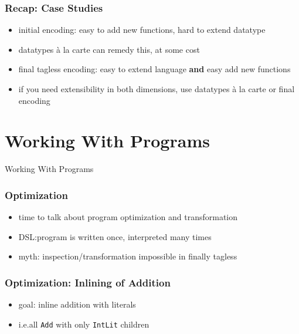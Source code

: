 \documentclass[aspectratio=169, hyperref={colorlinks, linkcolor=beamer@centricgreen}, urlcolor=links]{beamer}
\begin{document}
\begin{frame}
  \frametitle{Recap: Case Studies}
  \begin{itemize}
  \item initial encoding: easy to add new functions, hard to extend datatype
  \item datatypes \`{a} la carte can remedy this, at some cost
  \item final tagless encoding: easy to extend language \textbf{and} easy add new functions
  \item if you need extensibility in both dimensions, use datatypes \`{a} la carte or final encoding
  \end{itemize}
\end{frame}

\section{Working With Programs}\label{sec:working-with-programs}

\begin{frame}
  \begin{center}
    \Huge
    Working With Programs
  \end{center}
\end{frame}

\begin{frame}
  \frametitle{Optimization}
  \begin{itemize}
  \item time to talk about program optimization and transformation
  \item DSL:\@ program is written once, interpreted many times
  \item myth: inspection/transformation impossible in finally tagless
  \end{itemize}
\end{frame}

\begin{frame}
  \frametitle{Optimization: Inlining of Addition}
  \begin{itemize}
  \item goal: inline addition with literals
  \item i.e.\@ all \texttt{Add} with only \texttt{IntLit} children
  \end{itemize}
\end{frame}
\end{document}
